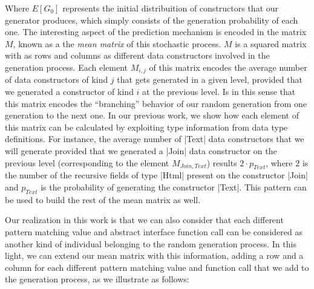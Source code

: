 Where $E[G_0]$ represents the initial distribuition of constructors that our
generator produces, which simply consists of the generation probability of each
one.
%
The interesting aspect of the prediction mechanism is encoded in the matrix $M$,
known as a the \emph{mean matrix} of this stochastic process.
%
$M$ is a squared matrix with as rows and columns as different data constructors
involved in the generation process.
%
Each element $M_{i,j}$ of this matrix encodes the average number of data
constructors of kind $j$ that gets generated in a given level, provided that we
generated a constructor of kind $i$ at the previous level.
%
Is in this sense that this matrix encodes the ``branching'' behavior of our
random generation from one generation to the next one.
%
In our previous work, we show how each element of this matrix can be calculated
by exploiting type information from data type definitions.
%
For instance, the average number of |Text| data constructors that we will
generate provided that we generated a |Join| data constructor on the previous
level (corresponding to the element $M_{Join, Text}$) results $2\cdot p_{Text}$,
where $2$ is the number of the recursive fields of type |Html| present on the
constructor |Join| and $p_{Text}$ is the probability of generating the
constructor |Text|.
%
This pattern can be used to build the rest of the mean matrix as well.




Our realization in this work is that we can also consider that each different
pattern matching value and abstract interface function call can be considered as
another kind of individual belonging to the random generation process.
%
In this light, we can extend our mean matrix with this information, adding a row
and a column for each different pattern matching value and function call that we
add to the generation process, as we illustrate as follows:


